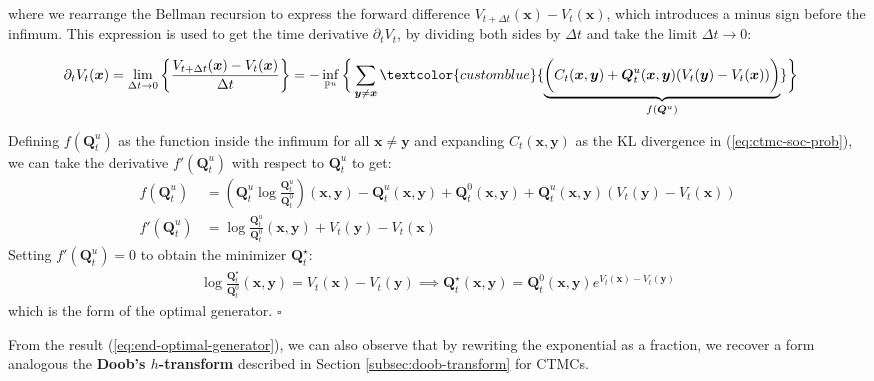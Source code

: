 \documentclass{article}
\newcommand{\boldtext}[1]{\textbf{\textcolor{MyGreen}{#1}}}
\newcommand{\bluetext}[1]{\textcolor{customblue}{#1}}
\begin{document}
where we rearrange the Bellman recursion to express the forward difference $V_{t+\Delta t}(\boldsymbol{x})-V_t(\boldsymbol{x})$, which introduces a minus sign before the infimum. This expression is used to get the time derivative $\partial_tV_t$, by dividing both sides by $\Delta t$ and take the limit $\Delta t\to 0$:
\begin{small}
\begin{align}
\partial_tV_t(\boldsymbol{x})=\lim_{\Delta t\to 0}\left\{\frac{V_{t+\Delta t}(\boldsymbol{x})-V_{t}(\boldsymbol{x})}{\Delta t}\right\}&=-\inf_{\mathbb{P}^u}\bigg\{\sum_{\boldsymbol{y}\neq \boldsymbol{x}}\bluetext{\underbrace{\bigg(C_t(\boldsymbol{x}, \boldsymbol{y})+\boldsymbol{Q}_t^u(\boldsymbol{x},\boldsymbol{y})(V_t(\boldsymbol{y})-V_t(\boldsymbol{x}))\bigg)}_{f(\boldsymbol{Q}^u)}}\bigg\}\label{eq:partial-t-value}
\end{align}
\end{small}
Defining $f(\boldsymbol{Q}_t^u)$ as the function inside the infimum for all $\boldsymbol{x}\neq \boldsymbol{y}$ and expanding $C_t(\boldsymbol{x},\boldsymbol{y})$ as the KL divergence in (\ref{eq:ctmc-soc-prob}), we can take the derivative $f'(\boldsymbol{Q}_t^u)$ with respect to $\boldsymbol{Q}_t^u$ to get:
\begin{align}
    f(\boldsymbol{Q}^u_t)&=\left(\boldsymbol{Q}^u_t\log \frac{\boldsymbol{Q}_t^u}{\boldsymbol{Q}_t^0}\right)(\boldsymbol{x}, \boldsymbol{y})-\boldsymbol{Q}^u_t(\boldsymbol{x},\boldsymbol{y})+\boldsymbol{Q}^0_t(\boldsymbol{x}, \boldsymbol{y})+\boldsymbol{Q}^u_t(\boldsymbol{x}, \boldsymbol{y})(V_t(\boldsymbol{y})-V_t(\boldsymbol{x}))\\
    f'(\boldsymbol{Q}^u_t)&=\log \frac{\boldsymbol{Q}_t^u}{\boldsymbol{Q}_t^0}(\boldsymbol{x}, \boldsymbol{y})+V_t(\boldsymbol{y})-V_t(\boldsymbol{x})
\end{align}
Setting $f'(\boldsymbol{Q}^u_t)=0$ to obtain the minimizer $\boldsymbol{Q}^\star_t$:
\begin{align}
    \log \frac{\boldsymbol{Q}_t^\star}{\boldsymbol{Q}_t^0}(\boldsymbol{x}, \boldsymbol{y})=V_t(\boldsymbol{x})-V_t(\boldsymbol{y})\implies \boxed{\boldsymbol{Q}^\star_t(\boldsymbol{x},\boldsymbol{y})=\boldsymbol{Q}^0_t(\boldsymbol{x},\boldsymbol{y})e^{V_t(\boldsymbol{x})-V_t(\boldsymbol{y})}}\label{eq:end-optimal-generator}
\end{align}
which is the form of the optimal generator. \hfill $\square$

From the result (\ref{eq:end-optimal-generator}), we can also observe that by rewriting the exponential as a fraction, we recover a form analogous the \boldtext{Doob's $h$-transform} described in Section \ref{subsec:doob-transform} for CTMCs. 
\end{document}
